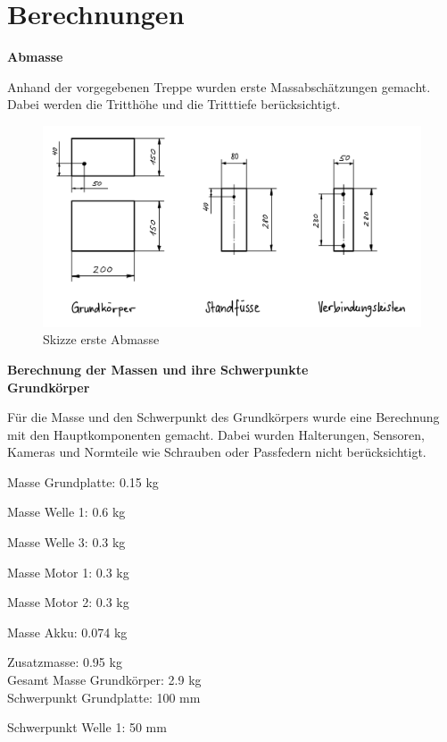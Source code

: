 \section{Berechnungen}

\textbf{Abmasse}

Anhand der vorgegebenen Treppe wurden erste Massabschätzungen gemacht. Dabei werden die Tritthöhe und die Tritttiefe berücksichtigt.

\begin{figure}[H]
  \includegraphics[width=1
  \textwidth]{img/Treppensteigen/Erste Abmasse}
  \centering
  \caption{Skizze erste Abmasse}
\end{figure}

\textbf{Berechnung der Massen und ihre Schwerpunkte}\\

\textbf{Grundkörper}

Für die Masse und den Schwerpunkt des Grundkörpers wurde eine Berechnung mit den Hauptkomponenten gemacht. Dabei wurden Halterungen, Sensoren, Kameras und Normteile wie Schrauben oder Passfedern nicht berücksichtigt.

Masse Grundplatte: 0.15 kg

Masse Welle 1: 0.6 kg

Masse Welle 3: 0.3 kg

Masse Motor 1: 0.3 kg

Masse Motor 2: 0.3 kg

Masse Akku: 0.074 kg

Zusatzmasse: 0.95 kg\\

Gesamt Masse Grundkörper: 2.9 kg\\

Schwerpunkt Grundplatte: 100 mm

Schwerpunkt Welle 1: 50 mm


